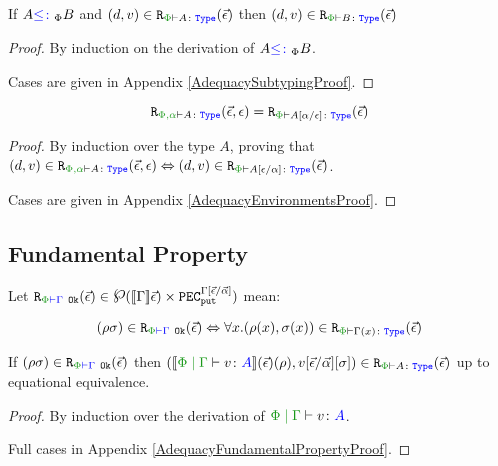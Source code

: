 \begin{framed}
    \begin{theorem}\label{LogRelSubtype}
        If $A{\color{blue} \leq\colon}_\Phi B$ and $\inLogRelPE{d}{v}{A}$ then $\inLogRelPE{d}{v}{B}$
    \end{theorem}
    
    \begin{proof}
        By induction on the derivation of $A{\color{blue} \leq\colon}_\Phi B$.
    
        Cases are given in Appendix \ref{AdequacySubtypingProof}.
    \end{proof}
\end{framed}

\begin{framed}
    \begin{lemma}\label{EnvironmentLemma}
        $$\erelates{\P,\a}{A}(\ev, \e) = \erelates{\P}{A\ssub{\e}{\a}}(\ev)$$
    \end{lemma}
    
    \begin{proof}
        By induction over the type $A$, proving that $\inLogRel{d}{v}{\P,\a}{A}{\ev, \e} \Leftrightarrow \inLogRelPE{d}{v}{A\ssub{\a}{\e}}$.
    
        Cases are given in Appendix \ref{AdequacyEnvironmentsProof}.
    \end{proof}
\end{framed}




\subsection{Fundamental Property}\label{FundProp}

\begin{framed}
    \begin{theorem}\label{FundPropTheorem}
        Let $\erelatesg{\P}{\G}(\ev) \in \powset{\deno{\G}\ev)\times \pecput^{\G\ssub{\av}{\ev}}}$ mean:
    
        \begin{equation}
            \label{LogicalRelationTypeEnvironment}
            \inLogRelPEG{\rho}{\si}{\G} \Leftrightarrow \forall x. \inLogRelPE{\rho(x)}{\si(x)}{\G(x)}
        \end{equation}
    
    
        If $\inLogRelPEG{\rho}{\si}{\G}$ then $\inLogRelPE{\deno{\gpetyperelation{v}{A}}\fundRho}{v\fundSub}{A}$ up to equational equivalence.    
    \end{theorem}
    
    \begin{proof}
        By induction over the derivation of $\gpetyperelation{v}{A}$.
        
        Full cases in Appendix \ref{AdequacyFundamentalPropertyProof}.
    \end{proof}
\end{framed}


